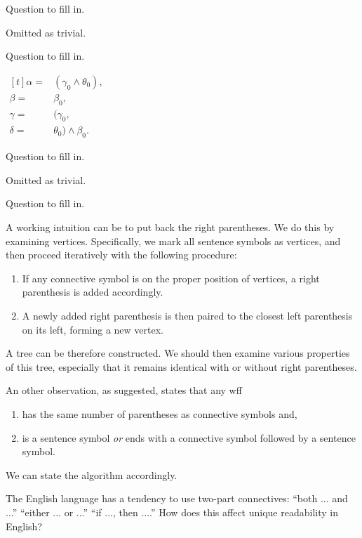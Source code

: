 \begin{exercise}
  Question to fill in.
\end{exercise}

Omitted as trivial.

\begin{exercise}
  Question to fill in.
\end{exercise}

$\begin{aligned}[t]
    \alpha= & (\gamma_0\wedge\theta_0), \\\beta=&\beta_0,\\\gamma=&(\gamma_0,\\\delta=&\theta_0)\wedge \beta_0.
  \end{aligned}$

\begin{exercise}
  Question to fill in.
\end{exercise}

Omitted as trivial.

\begin{exercise}
  Question to fill in.
\end{exercise}

A working intuition can be to put back the right parentheses. We do this by examining vertices. Specifically, we mark all sentence symbols as vertices, and then proceed iteratively with the following procedure:
\begin{enumerate}
  \item If any connective symbol is on the proper position of vertices, a right parenthesis is added accordingly.
  \item A newly added right parenthesis is then paired to the closest left parenthesis on its left, forming a new vertex.
\end{enumerate}
A tree can be therefore constructed. We should then examine various properties of this tree, especially that it remains identical with or without right parentheses.

An other observation, as suggested, states that any wff
\begin{enumerate}
  \item has the same number of parentheses as connective symbols and,
  \item is a sentence symbol \textit{or} ends with a connective symbol followed by a sentence symbol.
\end{enumerate}
We can state the algorithm accordingly.

\begin{exercise}
  The English language has a tendency to use two-part connectives:
  “both ... and ...” “either ... or ...” “if ..., then ....” How does
  this affect unique readability in English?
\end{exercise}

